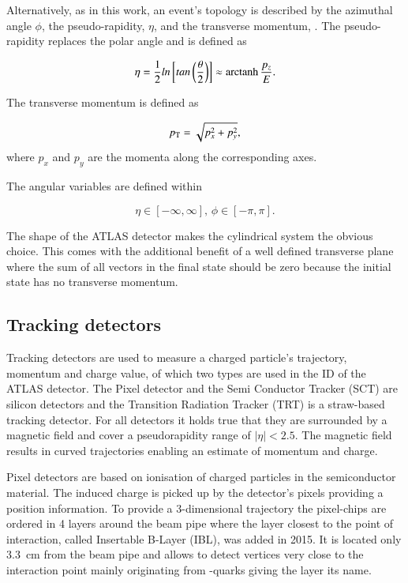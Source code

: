 Alternatively, as in this work, an event's topology is described by the azimuthal angle $\phi$, the pseudo-rapidity, $\eta$, and the transverse momentum, \pT. The pseudo-rapidity replaces the polar angle and is defined as

\begin{equation}
\eta = \frac{1}{2} ln\left[ tan\left(\frac{\theta}{2}\right)\right] \approx \operatorname{arctanh}\frac{p_z}{E}.
\end{equation}

The transverse momentum is defined as

\begin{equation}
p_{\text{T}} = \sqrt{p_x^2 + p_y^2},
\end{equation}
where $p_x$ and $p_y$ are the momenta along the corresponding axes. 

The angular variables are defined within

\begin{equation}
\eta \in [-\infty,\infty],\,
\phi \in [-\pi,\pi].
\end{equation}


The shape of the ATLAS detector makes the cylindrical system the obvious choice. This comes with the additional benefit of a well defined transverse plane where the sum of all vectors in the final state should be zero because the initial state has no transverse momentum.



\subsection{Tracking detectors}

Tracking detectors are used to measure a charged particle's trajectory, momentum and charge value, of which two types are used in the ID of the ATLAS detector. The Pixel detector and the Semi Conductor Tracker (SCT) are silicon detectors and the Transition Radiation Tracker (TRT) is a straw-based tracking detector. For all detectors it holds true that they are surrounded by a magnetic field and cover a pseudorapidity range of $|\eta| < 2.5$. The magnetic field results in curved trajectories enabling an estimate of momentum and charge.\cite{leo}

Pixel detectors are based on ionisation of charged particles in the semiconductor material. The induced charge is picked up by the detector's pixels providing a position information. To provide a 3-dimensional trajectory the pixel-chips are ordered in 4 layers around the beam pipe where the layer closest to the point of interaction, called Insertable B-Layer (IBL), was added in 2015. It is located only \SI{3.3}{\centi \metre} from the beam pipe and allows to detect vertices very close to the interaction point mainly originating from \Pbottom-quarks giving the layer its name.~\cite{pixel_run2}

